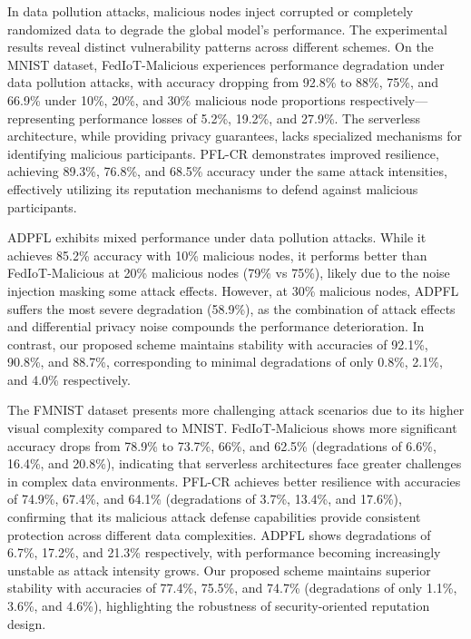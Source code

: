 \documentclass[a4paper]{cas-dc}
\begin{document}
In data pollution attacks, malicious nodes inject corrupted or completely randomized data to degrade the global model's performance. The experimental results reveal distinct vulnerability patterns across different schemes. On the MNIST dataset, FedIoT-Malicious experiences performance degradation under data pollution attacks, with accuracy dropping from 92.8\% to 88\%, 75\%, and 66.9\% under 10\%, 20\%, and 30\% malicious node proportions respectively—representing performance losses of 5.2\%, 19.2\%, and 27.9\%. The serverless architecture, while providing privacy guarantees, lacks specialized mechanisms for identifying malicious participants. PFL-CR demonstrates improved resilience, achieving 89.3\%, 76.8\%, and 68.5\% accuracy under the same attack intensities, effectively utilizing its reputation mechanisms to defend against malicious participants.

ADPFL exhibits mixed performance under data pollution attacks. While it achieves 85.2\% accuracy with 10\% malicious nodes, it performs better than FedIoT-Malicious at 20\% malicious nodes (79\% vs 75\%), likely due to the noise injection masking some attack effects. However, at 30\% malicious nodes, ADPFL suffers the most severe degradation (58.9\%), as the combination of attack effects and differential privacy noise compounds the performance deterioration. In contrast, our proposed scheme maintains stability with accuracies of 92.1\%, 90.8\%, and 88.7\%, corresponding to minimal degradations of only 0.8\%, 2.1\%, and 4.0\% respectively.

The FMNIST dataset presents more challenging attack scenarios due to its higher visual complexity compared to MNIST. FedIoT-Malicious shows more significant accuracy drops from 78.9\% to 73.7\%, 66\%, and 62.5\% (degradations of 6.6\%, 16.4\%, and 20.8\%), indicating that serverless architectures face greater challenges in complex data environments. PFL-CR achieves better resilience with accuracies of 74.9\%, 67.4\%, and 64.1\% (degradations of 3.7\%, 13.4\%, and 17.6\%), confirming that its malicious attack defense capabilities provide consistent protection across different data complexities. ADPFL shows degradations of 6.7\%, 17.2\%, and 21.3\% respectively, with performance becoming increasingly unstable as attack intensity grows. Our proposed scheme maintains superior stability with accuracies of 77.4\%, 75.5\%, and 74.7\% (degradations of only 1.1\%, 3.6\%, and 4.6\%), highlighting the robustness of security-oriented reputation design.
\end{document}
